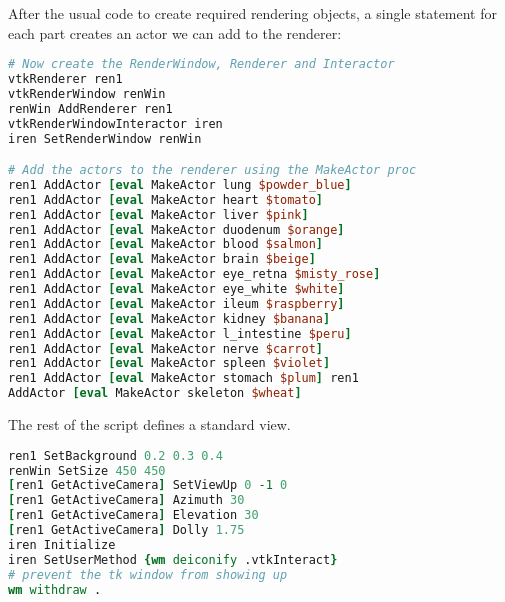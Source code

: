 After the usual code to create required rendering objects, a single statement for each part creates an actor we can add to the renderer:

\begin{lstlisting}[language=TCL, caption={Create the actors.}]
# Now create the RenderWindow, Renderer and Interactor
vtkRenderer ren1
vtkRenderWindow renWin
renWin AddRenderer ren1
vtkRenderWindowInteractor iren
iren SetRenderWindow renWin

# Add the actors to the renderer using the MakeActor proc
ren1 AddActor [eval MakeActor lung $powder_blue]
ren1 AddActor [eval MakeActor heart $tomato]
ren1 AddActor [eval MakeActor liver $pink]
ren1 AddActor [eval MakeActor duodenum $orange]
ren1 AddActor [eval MakeActor blood $salmon]
ren1 AddActor [eval MakeActor brain $beige]
ren1 AddActor [eval MakeActor eye_retna $misty_rose]
ren1 AddActor [eval MakeActor eye_white $white]
ren1 AddActor [eval MakeActor ileum $raspberry]
ren1 AddActor [eval MakeActor kidney $banana]
ren1 AddActor [eval MakeActor l_intestine $peru]
ren1 AddActor [eval MakeActor nerve $carrot]
ren1 AddActor [eval MakeActor spleen $violet]
ren1 AddActor [eval MakeActor stomach $plum] ren1
AddActor [eval MakeActor skeleton $wheat]
\end{lstlisting}

The rest of the script defines a standard view.

\begin{lstlisting}[language=TCL, caption={Create the view.}]
ren1 SetBackground 0.2 0.3 0.4
renWin SetSize 450 450
[ren1 GetActiveCamera] SetViewUp 0 -1 0
[ren1 GetActiveCamera] Azimuth 30
[ren1 GetActiveCamera] Elevation 30
[ren1 GetActiveCamera] Dolly 1.75
iren Initialize
iren SetUserMethod {wm deiconify .vtkInteract}
# prevent the tk window from showing up
wm withdraw .
\end{lstlisting}

